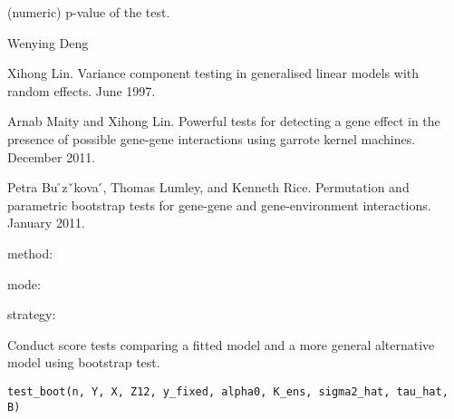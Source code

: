 \documentclass[a4paper]{book}
\begin{document}
%
\begin{Value}
\begin{ldescription}
\item[\code{pvalue}] (numeric) p-value of the test.
\end{ldescription}
\end{Value}
%
\begin{Author}\relax
Wenying Deng
\end{Author}
%
\begin{References}\relax
Xihong Lin. Variance component testing in generalised linear
models with random effects. June 1997.

Arnab Maity and Xihong Lin. Powerful tests for detecting a gene effect in
the presence of possible gene-gene interactions using garrote kernel
machines. December 2011.

Petra Bu ̊zˇkova ́, Thomas Lumley, and Kenneth Rice. Permutation and
parametric bootstrap tests for gene-gene and gene-environment interactions.
January 2011.
\end{References}
%
\begin{SeeAlso}\relax
method: 

mode: 

strategy: 
\end{SeeAlso}
%
\begin{Description}\relax
Conduct score tests comparing a fitted model and a more general alternative
model using bootstrap test.
\end{Description}
%
\begin{Usage}
\begin{verbatim}
test_boot(n, Y, X, Z12, y_fixed, alpha0, K_ens, sigma2_hat, tau_hat, B)
\end{verbatim}
\end{Usage}
%
\end{document}
